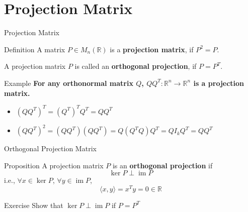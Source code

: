 \documentclass[aspectratio=169, UTF8]{ctexbeamer}
\begin{document}
\section{Projection Matrix}
\begin{frame}{Projection Matrix}
    \begin{block}{Definition}
        A matrix $P \in M_n(\mathbb{R})$ is a \textbf{projection matrix}, if $P^2=P$.

        A projection matrix $P$ is called an \textbf{orthogonal projection}, if $P=P^T$.
    \end{block}
    \begin{block}{Example}
        \textbf{For any orthonormal matrix $Q$, $QQ^T: \mathbb{R}^n \to \mathbb{R}^n$ is a projection matrix.}
        \begin{itemize}
            \item $(QQ^T)^T = (Q^T)^T Q^T = Q Q^T$
            \item $(QQ^T)^2 = (QQ^T)(QQ^T) = Q(Q^T Q)Q^T = Q I_k Q^T = QQ^T$
        \end{itemize}
    \end{block}
\end{frame}
\begin{frame}{Orthogonal Projection Matrix}
    \begin{block}{Proposition}
        A projection matrix $P$ is an \textbf{orthogonal projection} if
        $$ \ker P \perp \operatorname{im} P $$
        i.e., $\forall x \in \ker P$, $\forall y \in \operatorname{im} P$,
        $$ \langle x, y \rangle = x^T y = 0 \in \mathbb{R} $$
    \end{block}
    \begin{block}{Exercise}
        Show that $ \ker P \perp \operatorname{im} P $ if $P = P^T$
    \end{block}
\end{frame}
\end{document}
